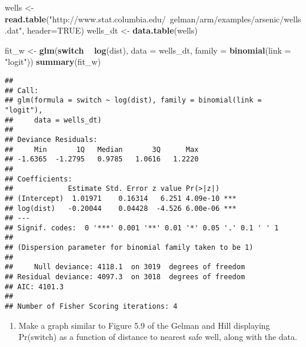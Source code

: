 \documentclass[]{article}
\newenvironment{Shaded}{\begin{snugshade}}{\end{snugshade}}
\newcommand{\KeywordTok}[1]{\textcolor[rgb]{0.13,0.29,0.53}{\textbf{#1}}}
\newcommand{\DataTypeTok}[1]{\textcolor[rgb]{0.13,0.29,0.53}{#1}}
\newcommand{\DecValTok}[1]{\textcolor[rgb]{0.00,0.00,0.81}{#1}}
\newcommand{\FloatTok}[1]{\textcolor[rgb]{0.00,0.00,0.81}{#1}}
\newcommand{\StringTok}[1]{\textcolor[rgb]{0.31,0.60,0.02}{#1}}
\newcommand{\CommentTok}[1]{\textcolor[rgb]{0.56,0.35,0.01}{\textit{#1}}}
\newcommand{\OtherTok}[1]{\textcolor[rgb]{0.56,0.35,0.01}{#1}}
\newcommand{\ControlFlowTok}[1]{\textcolor[rgb]{0.13,0.29,0.53}{\textbf{#1}}}
\newcommand{\OperatorTok}[1]{\textcolor[rgb]{0.81,0.36,0.00}{\textbf{#1}}}
\newcommand{\NormalTok}[1]{#1}
\providecommand{\tightlist}{%
  \setlength{\itemsep}{0pt}\setlength{\parskip}{0pt}}
\begin{document}
\begin{Shaded}
\begin{Highlighting}[]
\NormalTok{wells <-}\StringTok{ }\KeywordTok{read.table}\NormalTok{(}\StringTok{"http://www.stat.columbia.edu/~gelman/arm/examples/arsenic/wells.dat"}\NormalTok{, }\DataTypeTok{header=}\OtherTok{TRUE}\NormalTok{)}
\NormalTok{wells_dt <-}\StringTok{ }\KeywordTok{data.table}\NormalTok{(wells)}

\NormalTok{fit_w <-}\StringTok{ }\KeywordTok{glm}\NormalTok{(}\ControlFlowTok{switch} \OperatorTok{~}\StringTok{ }\KeywordTok{log}\NormalTok{(dist), }\DataTypeTok{data =}\NormalTok{ wells_dt, }\DataTypeTok{family =} \KeywordTok{binomial}\NormalTok{(}\DataTypeTok{link =} \StringTok{"logit"}\NormalTok{))}
\KeywordTok{summary}\NormalTok{(fit_w)}
\end{Highlighting}
\end{Shaded}

\begin{verbatim}
## 
## Call:
## glm(formula = switch ~ log(dist), family = binomial(link = "logit"), 
##     data = wells_dt)
## 
## Deviance Residuals: 
##     Min       1Q   Median       3Q      Max  
## -1.6365  -1.2795   0.9785   1.0616   1.2220  
## 
## Coefficients:
##             Estimate Std. Error z value Pr(>|z|)    
## (Intercept)  1.01971    0.16314   6.251 4.09e-10 ***
## log(dist)   -0.20044    0.04428  -4.526 6.00e-06 ***
## ---
## Signif. codes:  0 '***' 0.001 '**' 0.01 '*' 0.05 '.' 0.1 ' ' 1
## 
## (Dispersion parameter for binomial family taken to be 1)
## 
##     Null deviance: 4118.1  on 3019  degrees of freedom
## Residual deviance: 4097.3  on 3018  degrees of freedom
## AIC: 4101.3
## 
## Number of Fisher Scoring iterations: 4
\end{verbatim}

\begin{enumerate}
\def\labelenumi{\arabic{enumi}.}
\setcounter{enumi}{1}
\tightlist
\item
  Make a graph similar to Figure 5.9 of the Gelman and Hill displaying
  Pr(switch) as a function of distance to nearest safe well, along with
  the data.
\end{enumerate}

\begin{Shaded}
\end{Shaded}
\end{document}

